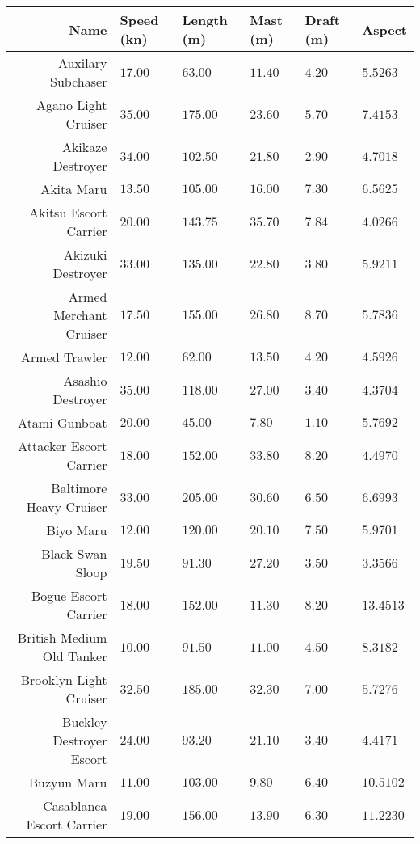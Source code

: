 \centering
\begin{tabularx}{\textwidth}{|r|l|l|l|l|X|}
\hline
\textbf{Name} & \textbf{Speed (kn)} & \textbf{Length (m)} & \textbf{Mast (m)} & \textbf{Draft (m)} & \textbf{Aspect}\\
\hline
 Auxilary Subchaser & $17.00$ & $63.00$ & $11.40$ & $4.20$ & $5.5263$ \\
\hline
Agano Light Cruiser & $35.00$ & $175.00$ & $23.60$ & $5.70$ & $7.4153$ \\
\hline
Akikaze Destroyer & $34.00$ & $102.50$ & $21.80$ & $2.90$ & $4.7018$ \\
\hline
Akita Maru & $13.50$ & $105.00$ & $16.00$ & $7.30$ & $6.5625$ \\
\hline
Akitsu Escort Carrier & $20.00$ & $143.75$ & $35.70$ & $7.84$ & $4.0266$ \\
\hline
Akizuki Destroyer & $33.00$ & $135.00$ & $22.80$ & $3.80$ & $5.9211$ \\
\hline
Armed Merchant Cruiser & $17.50$ & $155.00$ & $26.80$ & $8.70$ & $5.7836$ \\
\hline
Armed Trawler & $12.00$ & $62.00$ & $13.50$ & $4.20$ & $4.5926$ \\
\hline
Asashio Destroyer & $35.00$ & $118.00$ & $27.00$ & $3.40$ & $4.3704$ \\
\hline
Atami Gunboat & $20.00$ & $45.00$ & $7.80$ & $1.10$ & $5.7692$ \\
\hline
Attacker Escort Carrier & $18.00$ & $152.00$ & $33.80$ & $8.20$ & $4.4970$ \\
\hline
Baltimore Heavy Cruiser & $33.00$ & $205.00$ & $30.60$ & $6.50$ & $6.6993$ \\
\hline
Biyo Maru & $12.00$ & $120.00$ & $20.10$ & $7.50$ & $5.9701$ \\
\hline
Black Swan Sloop & $19.50$ & $91.30$ & $27.20$ & $3.50$ & $3.3566$ \\
\hline
Bogue Escort Carrier & $18.00$ & $152.00$ & $11.30$ & $8.20$ & $13.4513$ \\
\hline
British Medium Old Tanker & $10.00$ & $91.50$ & $11.00$ & $4.50$ & $8.3182$ \\
\hline
Brooklyn Light Cruiser & $32.50$ & $185.00$ & $32.30$ & $7.00$ & $5.7276$ \\
\hline
Buckley Destroyer Escort & $24.00$ & $93.20$ & $21.10$ & $3.40$ & $4.4171$ \\
\hline
Buzyun Maru & $11.00$ & $103.00$ & $9.80$ & $6.40$ & $10.5102$ \\
\hline
Casablanca Escort Carrier & $19.00$ & $156.00$ & $13.90$ & $6.30$ & $11.2230$ \\

\end{tabularx}
